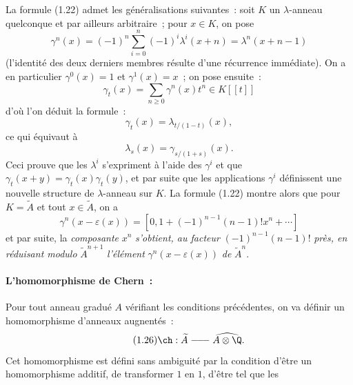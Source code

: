 La
formule (1.22) admet les généralisations suivantes~: soit $K$ un $\lambda$-anneau quelconque et par ailleurs arbitraire~; pour $x\in K$, on pose
\begin{equation}\tag{1.23}
\gamma^n(x)=(-1)^n\sum_{i=0}^n(-1)^i\lambda^i(x+n)=\lambda^n(x+n-1)
\end{equation}
(l'identité des deux derniers membres résulte d'une récurrence immédiate). On a en particulier $\gamma^0(x)=1$ et $\gamma^1(x)=x$~; on pose ensuite~:
\begin{equation}\tag{1.24}
\gamma_t(x)=\sum_{n\geq0}\gamma^n(x)t^n\in K[[t]]
\end{equation}
d'où l'on déduit la formule~:
\begin{equation}\tag{1.25}
\gamma_t(x)=\lambda_{t/(1-t)}(x),
\end{equation}
ce qui équivaut à
\begin{equation}\tag{1.25 bis}
\lambda_s(x)=\gamma_{s/(1+s)}(x).
\end{equation}
Ceci prouve que les $\lambda^i$ s'expriment à l'aide des $\gamma^i$ et que $\gamma_t(x+y)=\gamma_t(x)\gamma_t(y)$, et par suite que les applications $\gamma^i$ définissent une nouvelle structure de $\lambda$-anneau sur $K$. La formule (1.22) montre alors que pour $K=\widetilde A$ et tout $x\in\widetilde A$, on a
\begin{equation}\tag{1.22 bis}
\gamma^n(x-\varepsilon(x))=[0,1+(-1)^{n-1}(n-1)!x^n+\cdots]
\end{equation}
et par suite, la \emph{composante} $x^n$ \emph{s'obtient, au facteur} $(-1)^{n-1}(n-1)!$ \emph{près, en réduisant modulo} $\widetilde A^{n+1}$ \emph{l'élément} $\gamma^n(x-\varepsilon(x))$ \emph{de} $\widetilde A^n$.

\paragraph{L'homomorphisme de Chern~:}
Pour tout anneau gradué $A$ vérifiant les conditions précédentes, on va définir un homomorphisme d'anneaux augnentés~:
\begin{equation}\tag{1.26}
\ch:\widetilde A\relbar\joinrel\relbar\joinrel\relbar \widehat{A\otimes\Q}.
\end{equation}
Cet homomorphisme est défini sans ambiguité par la condition d'être un homomorphisme additif, de transformer $1$ en $1$, d'être tel que les
